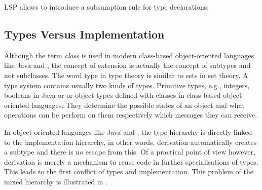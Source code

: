LSP allows to introduce a subsumption rule for type declarations:

\begin{defn}[Subsumption]
\label{def:subsumption}
	\begin{mathpar}
	\end{mathpar}
\end{defn}

\subsection{Types Versus Implementation}
\label{sec:sharingTypes}

Although the term \emph{class} is used in modern class-based
object-oriented languages like Java and \cpp
{}
, the concept of extension
is actually the concept of subtypes and not subclasses. The word type
in type theory is similar to sets in set theory. A type system contains
usually two kinds of types. Primitive types, e.g., integers, booleans
in Java or \cpp or object types defined with classes in class based
object-oriented languages. They determine the possible states of an
object and what operations can be perform on them respectively which
messages they can receive.

In object-oriented languages like Java and \cpp, the type hierarchy
is directly linked to the implementation hierarchy, in other words,
derivation automatically creates a subtype and there is no escape from
this. Of a practical point of view however, derivation is merely a
mechanism to reuse code in further specialisations of types. This leads
to the first conflict of types and implementation. This problem of
the mixed hierarchy is illustrated in 
\cite{simons_theory_2003-4}.

